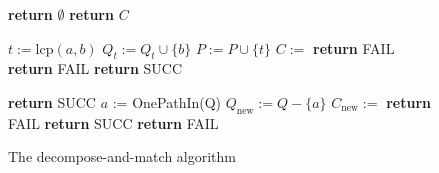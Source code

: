 \documentclass{acm_proc_article-sp}
\begin{document}
\begin{figure}
\begin{algorithmic}[1]

\State \textbf{return} $\emptyset$
\Else
{}
\EndIf
\EndFor
\State \textbf{return} $C$
\EndProcedure

\State {}

\State $t := \mathrm{lcp}(a,b)$
\State $Q_t := Q_t \cup \{b\}$
\State $P := P \cup \{t\}$
\EndFor
{}
\State $C := $ 
\State \textbf{return} FAIL
\EndIf
\EndIf
\EndFor
\EndFor
{}
\State \textbf{return} FAIL
\EndIf
\EndFor
\State \textbf{return} SUCC
\EndProcedure

\State {}

 \textbf{return} SUCC
\EndIf
\State $a$ := OnePathIn(Q)
\State $Q_{\mathrm{new}} := Q - \{a\}$
\State $C_{\mathrm{new}} := $ 
 \textbf{return} FAIL
\EndIf
{}
\textbf{return} SUCC
\EndIf
\EndFor
\State \textbf{return} FAIL
\EndProcedure

\end{algorithmic}
\caption{The decompose-and-match algorithm}\label{submatchalgo}
\end{figure}
\end{document}
